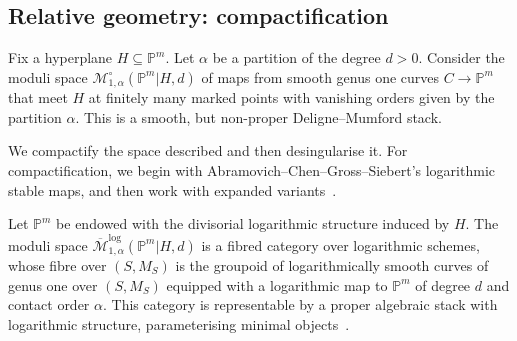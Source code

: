 \documentclass[11pt]{amsart}
\newcommand{\PP}{\mathbb P}
\newcommand{\VZ}{\pazocal{V\!Z}}
\renewcommand{\to}{\rightarrow}
\newcommand{\Mcal}{\mathcal{M}}
\newcommand{\ol}[1]{\overline{#1}}
\theoremstyle{definition}
\theoremstyle{definition}
\begin{document}
\subsection{Relative geometry: compactification} Fix a hyperplane $H\subseteq \mathbb P^m$. Let $\alpha$ be a partition of the degree $d>0$. Consider the moduli space $\mathcal M_{1,\alpha}^\circ(\mathbb P^m|H,d)$ of maps from smooth genus one curves $C\to \mathbb P^m$ that meet $H$ at finitely many marked points with vanishing orders given by the partition $\alpha$. This is a smooth, but non-proper Deligne--Mumford stack. 

We compactify the space described and then desingularise it. For compactification, we begin with Abramovich--Chen--Gross--Siebert's logarithmic stable maps, and then work with expanded variants~\cite{AbramovichChenLog,ChenLog,GrossSiebertLog,KimLog}.

Let $\PP^m$ be endowed with the divisorial logarithmic structure induced by $H$. The moduli space $\overline{\mathcal{M}}^{\operatorname{log}}_{1,\alpha}(\mathbb P^m|H,d)$ is a fibred category over logarithmic schemes, whose fibre over $(S,M_S)$ is the groupoid of logarithmically smooth curves of genus one over $(S,M_S)$ equipped with a logarithmic map to $\mathbb P^m$ of degree $d$ and contact order $\alpha$. This category is representable by a proper algebraic stack with logarithmic structure, parameterising minimal objects~\cite{ChenLog}. 

\begin{comment}
There is a representable finite logarithmic morphism to the Kontsevich space, forgetting the logarithmic structure on the target:
$$
\overline{\mathcal M}^{\mathrm{log}}_{1,\alpha}(\mathbb P^m|H,d) \to \overline{\mathcal M}_{1,n}(\mathbb P^m,d).
$$
\end{comment}

\begin{comment}
As in the absolute setting, we consider the space of logarithmic morphisms from the universal curve $\mathcal{C} \to \mathfrak{M}_{1,n}^{\mathrm{cen}}$ to the logarithmic scheme $(\PP^m,H)$. We impose a compatibility condition, which says that the radius must pass through a vertex of positive degree in $\PP^m$ and contain only vertices of degree zero in its strict interior. In this way we obtain a logarithmic modification
\begin{equation*} \widetilde\VZ_{1,\alpha}(\PP^m|H,d) \to \ol\Mcal^{\mathrm{log}}_{1,\alpha}(\PP^m|H,d)\end{equation*}
which we refer to as the \textbf{moduli space of centrally aligned maps to $(\PP^m,H)$}. It is a logarithmic modification of $\overline{\mathcal M}^{\mathrm{log}}_{1,\alpha}(\mathbb P^m|H,d)$. We note that by definition this space maps down to $\widetilde\VZ_{1,n}(\PP^m,d)$, by forgetting the logarithmic structure of the target.
\end{comment}
\end{document}

